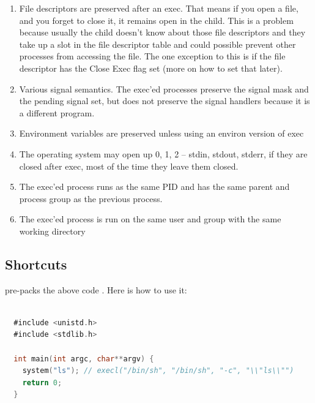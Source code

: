 \begin{itemize}
\begin{itemize}
\begin{enumerate}
\item File descriptors are preserved after an exec. That means if you open a file, and you forget to close it, it remains open in the child.
  This is a problem because usually the child doesn't know about those file descriptors and they take up a slot in the file descriptor table and could possible prevent other processes from accessing the file.
  The one exception to this is if the file descriptor has the Close Exec flag set (more on how to set that later).
\item Various signal semantics. The exec'ed processes preserve the signal mask and the pending signal set, but does not preserve the signal handlers because it is a different program.
\item Environment variables are preserved unless using an environ version of exec
  \item The operating system may open up 0, 1, 2 -- stdin, stdout, stderr, if they are closed after exec, most of the time they leave them closed.
  \item The exec'ed process runs as the same PID and has the same parent and process group as the previous process.
    \item The exec'ed process is run on the same user and group with the same working directory
\end{enumerate}

\subsection{Shortcuts}

 pre-packs the above code \cite[P. 371]{jones2010wg14}. Here is how to use it:

\begin{lstlisting}[language=C]

  #include <unistd.h>
  #include <stdlib.h>

  int main(int argc, char**argv) {
    system("ls"); // execl("/bin/sh", "/bin/sh", "-c", "\\"ls\\"")
    return 0;
  }
\end{lstlisting}


\end{itemize}
\end{itemize}
